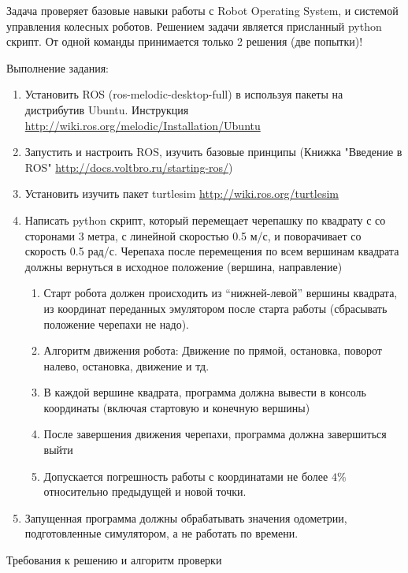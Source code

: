 
Задача проверяет базовые навыки работы с Robot Operating System, и системой управления колесных роботов.  
Решением задачи является присланный python скрипт. От одной команды принимается только 2 решения (две попытки)!

Выполнение задания:

\begin{enumerate}
    \item Установить ROS (ros-melodic-desktop-full) в используя пакеты на дистрибутив Ubuntu. Инструкция \url{http://wiki.ros.org/melodic/Installation/Ubuntu}
    \item Запустить и настроить ROS, изучить базовые принципы (Книжка "Введение в ROS" \url{http://docs.voltbro.ru/starting-ros/})
    \item Установить изучить пакет turtlesim \url{http://wiki.ros.org/turtlesim}
    \item Написать python скрипт, который перемещает черепашку по квадрату с со сторонами 3 метра, с линейной скоростью 0.5 м/с, и поворачивает со скорость 0.5 рад/с. Черепаха после перемещения по всем вершинам квадрата ﻿должны вернуться в исходное положение (вершина, направление)
    \begin{enumerate}
        \item Старт робота должен происходить из “нижней-левой” вершины квадрата, из координат переданных эмулятором после старта работы (сбрасывать положение черепахи не надо).
        \item Алгоритм движения робота: Движение по прямой, остановка, поворот налево, остановка, движение и тд.
        \item В каждой вершине квадрата, программа должна вывести в консоль координаты (включая стартовую и конечную вершины)
        \item После завершения движения черепахи, программа должна завершиться выйти
        \item Допускается погрешность работы с координатами не более $4\%$ относительно предыдущей и новой точки.
    \end{enumerate}
    \item Запущенная программа должны обрабатывать значения одометрии, подготовленные симулятором, а не работать по времени.
\end{enumerate}

Требования к решению и алгоритм проверки

